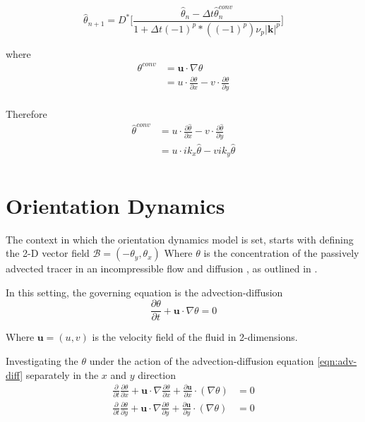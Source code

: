 \begin{equation}
\hat{\theta}_{n+1} = D^{*} \Biggr[ \frac{\hat{\theta}_{n} -\Delta t \hat{\theta}^{conv}_{n} }{1 + \Delta t(-1)^{p}*((-1)^p)\nu_{p}|\mathbf{k}|^{p}} \Biggr]
\end{equation}

where 
\begin{align*}
\theta^{conv} &= \mathbf{u} \cdot \nabla \theta \\
  &= u \cdot \frac{\partial \theta}{\partial x} - v \cdot \frac{\partial \theta}{\partial y} \\
\end{align*}

Therefore
\begin{align*}
\hat{\theta}^{conv} &= u \cdot \frac{\partial \hat{\theta}}{\partial x} - v \cdot \frac{\partial \hat{\theta}}{\partial y} \\
  &= u \cdot ik_{x}\hat{\theta} - v ik_{y}\hat{\theta} \\
\end{align*}


\section{Orientation Dynamics} \label{sec:theory-od}
The context in which the orientation dynamics model is set, starts with defining the 2-D vector field $\mathcal{B} = (-\theta_{y},\theta_{x})$
Where $\theta$ is the concentration of the passively advected tracer in an incompressible flow and diffusion , as outlined in \cite{main}. 

In this setting, the governing equation is the advection-diffusion
\begin{equation}
  \label{eqn:adv-diff}
  \frac{\partial \theta}{\partial t} + \mathbf{u} \cdot \nabla \theta = 0
\end{equation}

Where $\mathbf{u} = (u,v)$ is the velocity field of the fluid in 2-dimensions.

Investigating the $\theta$ under the action of the advection-diffusion equation \ref{eqn:adv-diff} separately in the $x$ and $y$ direction
\begin{align*}
  \frac{\partial }{\partial t}\frac{\partial \theta}{\partial x} + \mathbf{u} \cdot \nabla \frac{\partial \theta}{\partial x} + \frac{\partial \mathbf{u}}{\partial x} \cdot (\nabla \theta) &= 0 \\
  \frac{\partial }{\partial t}\frac{\partial \theta}{\partial y} + \mathbf{u} \cdot \nabla \frac{\partial \theta}{\partial y} + \frac{\partial \mathbf{u}}{\partial y} \cdot (\nabla \theta) &= 0
\end{align*}

